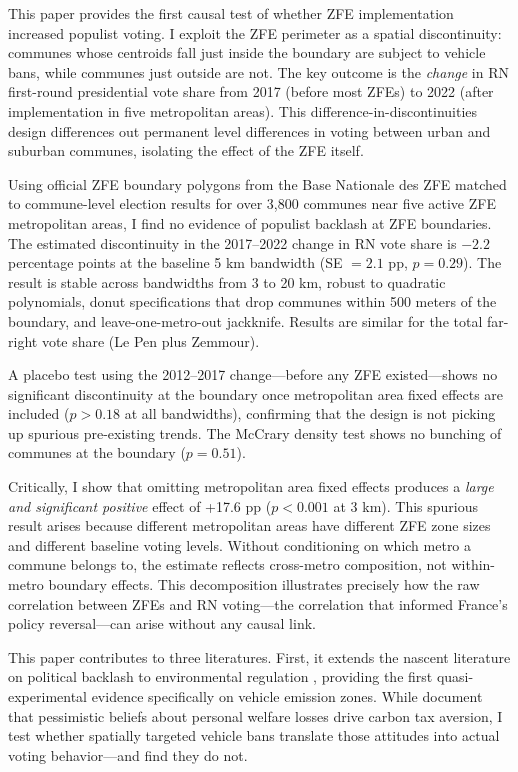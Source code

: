 \documentclass[12pt]{article}
\begin{document}
This paper provides the first causal test of whether ZFE implementation increased populist voting. I exploit the ZFE perimeter as a spatial discontinuity: communes whose centroids fall just inside the boundary are subject to vehicle bans, while communes just outside are not. The key outcome is the \textit{change} in RN first-round presidential vote share from 2017 (before most ZFEs) to 2022 (after implementation in five metropolitan areas). This difference-in-discontinuities design \citep{grembi2016discontinuities} differences out permanent level differences in voting between urban and suburban communes, isolating the effect of the ZFE itself.

Using official ZFE boundary polygons from the Base Nationale des ZFE matched to commune-level election results for over 3,800 communes near five active ZFE metropolitan areas, I find no evidence of populist backlash at ZFE boundaries. The estimated discontinuity in the 2017--2022 change in RN vote share is $-2.2$ percentage points at the baseline 5 km bandwidth (SE $= 2.1$ pp, $p = 0.29$). The result is stable across bandwidths from 3 to 20 km, robust to quadratic polynomials, donut specifications that drop communes within 500 meters of the boundary, and leave-one-metro-out jackknife. Results are similar for the total far-right vote share (Le Pen plus Zemmour).

A placebo test using the 2012--2017 change---before any ZFE existed---shows no significant discontinuity at the boundary once metropolitan area fixed effects are included ($p > 0.18$ at all bandwidths), confirming that the design is not picking up spurious pre-existing trends. The McCrary density test shows no bunching of communes at the boundary ($p = 0.51$).

Critically, I show that omitting metropolitan area fixed effects produces a \textit{large and significant positive} effect of +17.6 pp ($p < 0.001$ at 3 km). This spurious result arises because different metropolitan areas have different ZFE zone sizes and different baseline voting levels. Without conditioning on which metro a commune belongs to, the estimate reflects cross-metro composition, not within-metro boundary effects. This decomposition illustrates precisely how the raw correlation between ZFEs and RN voting---the correlation that informed France's policy reversal---can arise without any causal link.

This paper contributes to three literatures. First, it extends the nascent literature on political backlash to environmental regulation \citep{holmberg2023backlash,douenne2022yellowvests}, providing the first quasi-experimental evidence specifically on vehicle emission zones. While \citet{douenne2022yellowvests} document that pessimistic beliefs about personal welfare losses drive carbon tax aversion, I test whether spatially targeted vehicle bans translate those attitudes into actual voting behavior---and find they do not.
\end{document}
